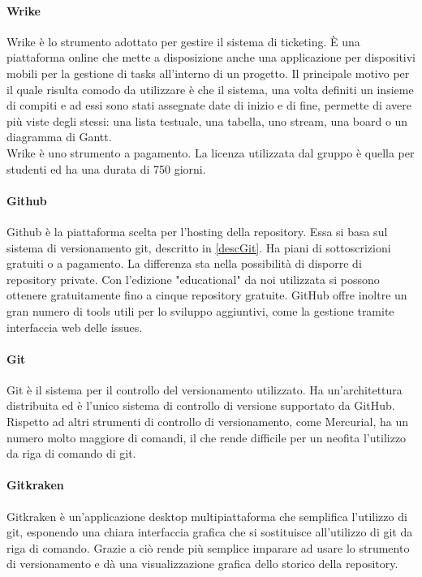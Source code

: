 		\paragraph{Wrike} \Spazio
		Wrike è lo strumento adottato per gestire il sistema di ticketing. È una piattaforma online che mette a disposizione anche una applicazione per dispositivi mobili per la gestione di tasks all'interno di un progetto. Il principale motivo per il quale risulta comodo da utilizzare è che il sistema, una volta definiti un insieme di compiti e ad essi sono stati  assegnate date di inizio e di fine, permette di avere più viste degli stessi: una lista testuale, una tabella, uno stream, una board o un diagramma di Gantt. \\ Wrike è uno strumento a pagamento. La licenza utilizzata dal gruppo è quella per studenti ed ha una durata di 750 giorni.
		
		\paragraph{Github} \Spazio
		Github è la piattaforma scelta per l'hosting della repository. Essa si basa sul sistema di versionamento git, descritto in \ref{descGit}. Ha piani di sottoscrizioni gratuiti o a pagamento. La differenza sta nella possibilità di disporre di repository private. Con l'edizione "educational" da noi utilizzata si possono ottenere gratuitamente fino a cinque repository gratuite. GitHub offre inoltre un gran numero di tools utili per lo sviluppo aggiuntivi, come la gestione tramite interfaccia web delle issues.
		
		\paragraph{Git} \Spazio
		Git\label{descGit} è il sistema per il controllo del versionamento utilizzato. Ha un'architettura distribuita ed è l'unico sistema di controllo di versione supportato da GitHub. Rispetto ad altri strumenti di controllo di versionamento, come Mercurial, ha un numero molto maggiore di comandi, il che rende difficile per un neofita l'utilizzo da riga di comando di git.
		
		\paragraph{Gitkraken} \Spazio
		Gitkraken è un'applicazione desktop multipiattaforma che semplifica l'utilizzo di git, esponendo una chiara interfaccia grafica che si sostituisce all'utilizzo di git da riga di comando. Grazie a ciò rende più semplice imparare ad usare lo strumento di versionamento e dà una visualizzazione grafica dello storico della repository.
		
